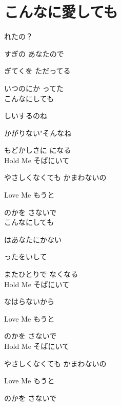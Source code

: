 \section{ こんなに愛しても}
\large{

れたの？

すぎの あなたので

ぎてくを ただってる

いつのにか ってた
\\

こんなにしても

しいするのね

かがりない"そんなね

もどかしさに になる
\\

Hold Me そばにいて

やさしくなくても かまわないの

Love Me もうと

のかを さないで
\\

こんなにしても

はあなたにかない

ったをいして

またひとりで なくなる
\\

Hold Me そばにいて

なはらないから

Love Me もうと

のかを さないで
\\

Hold Me そばにいて

やさしくなくても かまわないの

Love Me もうと

のかを さないで

}